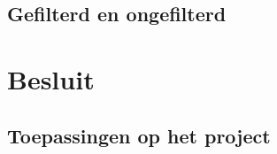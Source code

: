 \documentclass[a4paper,11pt]{article}
\begin{document}
	\subsection{Gefilterd en ongefilterd} \label{subsec:gefilterd en ongefilterd}
		
\newpage
\section{Besluit}\label{sec:besluit}
	
	
	\subsection{Toepassingen op het project}\label{subsec:toepassingen}
		

%
%
\end{document}
